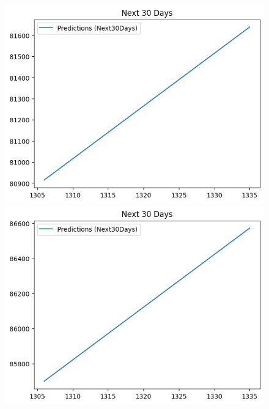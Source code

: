 \begin{figure}[H]
\begin{minipage}{0.15\textwidth}
    \centering
    \includegraphics[width=1\textwidth]{resources/chapter-5/newdata/predicted/VCB_LinearRegression_8-2 30 DAYS.png}
    \end{minipage}
    \hfill
        \begin{minipage}{0.15\textwidth}
    \centering
    \includegraphics[width=1\textwidth]{resources/chapter-5/newdata/predicted/VCB_LinearRegression_9-1 30 DAYS.png}
    \end{minipage}
    \hfill
    \begin{minipage}{0.15\textwidth}
    \centering

\end{minipage}
\end{figure}
